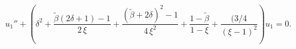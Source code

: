 \begin{equation}
u_1''+\left(\delta^2+\frac{\tilde{\beta}(2\delta+1)-1}{2\,\xi}+\frac{(\tilde{\beta}+2\delta)^2-1}{
4\,\xi^2}+\frac{1-\tilde{
\beta}}{1-\xi}+\frac{(3/4}{(\xi-1)^2}\right)u_1=0.
\label{u1}
\end{equation}

